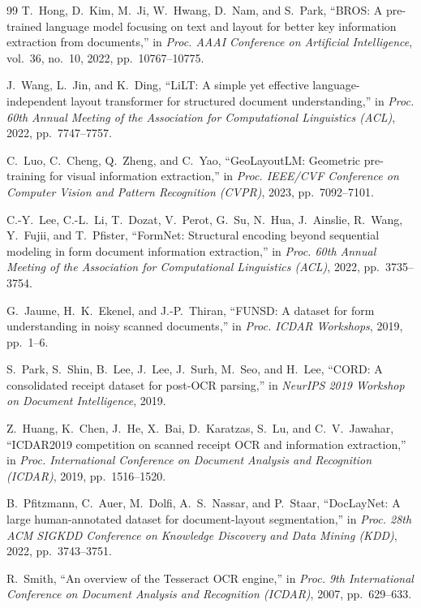 \documentclass[conference]{IEEEtran}
\begin{document}
\begin{thebibliography}{99}
T.~Hong, D.~Kim, M.~Ji, W.~Hwang, D.~Nam, and S.~Park,
``BROS: A pre-trained language model focusing on text and layout for
better key information extraction from documents,''
in \textit{Proc. AAAI Conference on Artificial Intelligence}, vol.~36,
no.~10, 2022, pp.~10767--10775.

J.~Wang, L.~Jin, and K.~Ding,
``LiLT: A simple yet effective language-independent layout transformer
for structured document understanding,''
in \textit{Proc. 60th Annual Meeting of the Association for
Computational Linguistics (ACL)}, 2022, pp.~7747--7757.

C.~Luo, C.~Cheng, Q.~Zheng, and C.~Yao,
``GeoLayoutLM: Geometric pre-training for visual information extraction,''
in \textit{Proc. IEEE/CVF Conference on Computer Vision and Pattern
Recognition (CVPR)}, 2023, pp.~7092--7101.

C.-Y.~Lee, C.-L.~Li, T.~Dozat, V.~Perot, G.~Su, N.~Hua,
J.~Ainslie, R.~Wang, Y.~Fujii, and T.~Pfister,
``FormNet: Structural encoding beyond sequential modeling in form
document information extraction,''
in \textit{Proc. 60th Annual Meeting of the Association for
Computational Linguistics (ACL)}, 2022, pp.~3735--3754.

G.~Jaume, H.~K.~Ekenel, and J.-P.~Thiran,
``FUNSD: A dataset for form understanding in noisy scanned
documents,''
in \textit{Proc. ICDAR Workshops}, 2019, pp.~1--6.

S.~Park, S.~Shin, B.~Lee, J.~Lee, J.~Surh, M.~Seo, and H.~Lee,
``CORD: A consolidated receipt dataset for post-OCR parsing,''
in \textit{NeurIPS 2019 Workshop on Document Intelligence}, 2019.

Z.~Huang, K.~Chen, J.~He, X.~Bai, D.~Karatzas, S.~Lu, and C.~V.~Jawahar,
``ICDAR2019 competition on scanned receipt OCR and information extraction,''
in \textit{Proc. International Conference on Document Analysis and
Recognition (ICDAR)}, 2019, pp.~1516--1520.

B.~Pfitzmann, C.~Auer, M.~Dolfi, A.~S.~Nassar, and P.~Staar,
``DocLayNet: A large human-annotated dataset for document-layout segmentation,''
in \textit{Proc. 28th ACM SIGKDD Conference on Knowledge Discovery and
Data Mining (KDD)}, 2022, pp.~3743--3751.

R.~Smith,
``An overview of the Tesseract OCR engine,''
in \textit{Proc. 9th International Conference on Document Analysis and
Recognition (ICDAR)}, 2007, pp.~629--633.


\end{thebibliography}
\end{document}
